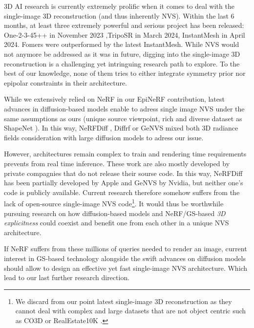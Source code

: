3D \ac{AI} research is currently extremely prolific when it comes to deal with the single-image 3D reconstruction (and thus inherently \ac{NVS}). Within the last 6 months, at least three extremely powerful and serious project has been released:  One-2-3-45++ \citep{liu2023one2345++} in November 2023 ,TripoSR \citep{tochilkin2024triposr} in March 2024, InstantMesh \citep{xu2024instantmesh} in April 2024. Fomers were outperformed by the latest InstantMesh. While \ac{NVS} would not anymore be addressed as it was in future, digging into the single-image 3D reconstruction is a challenging yet intringuing research path to explore. To the best of our knowledge, none of them tries to either integrate symmetry prior nor epipolar constraints in their architecture.


While we extensively relied on \ac{NeRF} in our EpiNeRF contribution, latest advances in diffusion-based models enable to adress single image \ac{NVS} under the same assumptions as ours (unique source viewpoint, rich and diverse dataset as ShapeNet \citep{chang2015shapenet}). In this way, NeRFDiff \citep{gu2023nerfdiff}, Diffrf \citep{muller2023diffrf} or GeNVS \citep{chan2023genvs} mixed both 3D radiance fields consideration with large diffusion models to adress our issue. 

However, architectures remain complex to train and rendering time requirements prevents from real time inference. These work are also mostly developed by private compagnies that do not release their sourse code. In this way, NeRFDiff has been partially developed by Apple and GeNVS by Nvidia, but neither one's code is publicly available. Current research therefore somehow suffers from the lack of open-source single-image \ac{NVS} code\footnote{We discard from our point latest single-image 3D reconstruction as they cannot deal with complex and large datasets that are not object centric such as CO3D \citep{reizenstein2021common}or RealEstate10K \citep{zhou2018stereo}.}. It would thus be worthwhile pursuing research on how diffusion-based models and \ac{NeRF}/\ac{GS}-based \textit{3D explicitness} could coexist and benefit one from each other in a unique \ac{NVS} architecture.

If \ac{NeRF} suffers from these millions of queries needed to render an image, current interest in \ac{GS}-based technology alongside the swift advances on diffusion models should allow to design an effective yet fast single-image \ac{NVS} architecture. Which lead to our last further research direction. 

